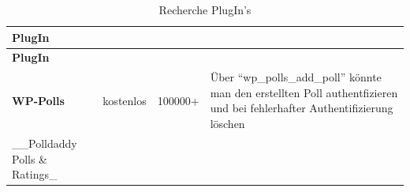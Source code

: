 \begin{longtable}[c]{@{}llll@{}}
\caption{Recherche PlugIn's}\tabularnewline
\toprule
\begin{minipage}[b]{0.33\columnwidth}\raggedright\strut
\textbf{PlugIn}
\strut\end{minipage} &
\begin{minipage}[b]{0.14\columnwidth}\raggedright\strut
\strut\end{minipage} &
\begin{minipage}[b]{0.14\columnwidth}\raggedright\strut
\strut\end{minipage} &
\begin{minipage}[b]{0.28\columnwidth}\raggedright\strut
\strut\end{minipage}\tabularnewline
\midrule
\endfirsthead
\toprule
\begin{minipage}[b]{0.33\columnwidth}\raggedright\strut
\textbf{PlugIn}
\strut\end{minipage} &
\begin{minipage}[b]{0.14\columnwidth}\raggedright\strut
\strut\end{minipage} &
\begin{minipage}[b]{0.14\columnwidth}\raggedright\strut
\strut\end{minipage} &
\begin{minipage}[b]{0.28\columnwidth}\raggedright\strut
\strut\end{minipage}\tabularnewline
\midrule
\endhead
\begin{minipage}[t]{0.33\columnwidth}\raggedright\strut
\textbf{WP-Polls}
\strut\end{minipage} &
\begin{minipage}[t]{0.14\columnwidth}\raggedright\strut
kostenlos
\strut\end{minipage} &
\begin{minipage}[t]{0.14\columnwidth}\raggedright\strut
100000+
\strut\end{minipage} &
\begin{minipage}[t]{0.28\columnwidth}\raggedright\strut
Über ``wp\_polls\_add\_poll'' könnte man den erstellten Poll
authentfizieren und bei fehlerhafter Authentifizierung löschen
\strut\end{minipage}\tabularnewline
\begin{minipage}[t]{0.33\columnwidth}\raggedright\strut
\_\_Polldaddy Polls \& Ratings\_
\strut\end{minipage} &
\begin{minipage}[t]{0.14\columnwidth}\raggedright\strut

\end{minipage}
\end{longtable}
